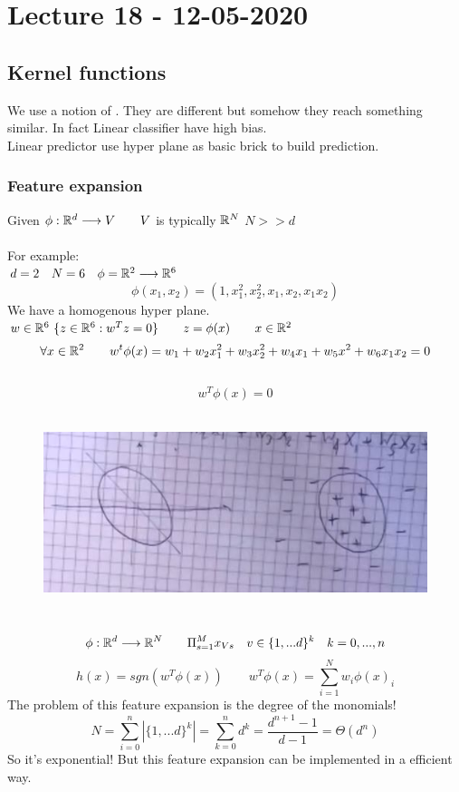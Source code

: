 \documentclass[../main.tex]{subfiles}
\begin{document}
\chapter{Lecture 18 - 12-05-2020}

\section{Kernel functions}

We use a notion of . They are different but somehow they reach something similar. In fact Linear classifier have high bias.
\\
Linear predictor use hyper plane as basic brick to build prediction.

\subsection{Feature expansion}
Given $\phi : \mathbb{R}^d \longrightarrow V \qquad V$ is typically $\mathbb{R}^N$ \quad $N >> d$
\\\\
For example:\\
$d = 2 \quad N = 6 \quad \phi = \mathbb{R}^2 \longrightarrow \mathbb{R}^6 \quad$ $$\phi(x_1,x_2) = (1,x_1^2,x_2^2,x_1,x_2,x_1 x_2)$$
We have a homogenous hyper plane.
\\
$w \in \mathbb{R}^6 \ \{ z \in \mathbb{R}^6 : w^T z = 0 \} \qquad z = \phi(x) \qquad x \in \mathbb{R}^2$
\\
$$
\forall x \in \mathbb{R}^2 \qquad w^t \phi(x) = w_1+w_2 x_1^2 + w_3 x_2^2 + w_4 x_1 + w_5 x^2 + w_6 x_1 x_2 = 0
$$\
$$
w^T \phi(x) = 0 
$$\\
\begin{figure}[h]
    \centering
    \includegraphics[width=0.6\linewidth]{../img/lez18-img1.JPG}
    \caption{} 
\end{figure}\\
$$
\phi : \mathbb{R}^d \longrightarrow \mathbb{R}^N \qquad \Pi_{s=1}^{M} x_{Vs} \quad v \in \{1,...d\}^k \quad k = 0, ..., n 
$$
$$
h(x) = sgn (w^T \phi(x)) \qquad w^T \phi(x) = \sum_{i= 1}^{N} w_i \phi(x)_i
$$
The problem of this feature expansion is the degree of the monomials!
\\
$$
N = \sum_{i = 0}^{n} | \{ 1,...d \}^k | = \sum_{k = 0}^{n} d^k  = \frac{d^{n+1}-1}{d-1} = \Theta (d^n)
$$
So it's exponential! But this feature expansion can be implemented in a efficient way.
\end{document}
